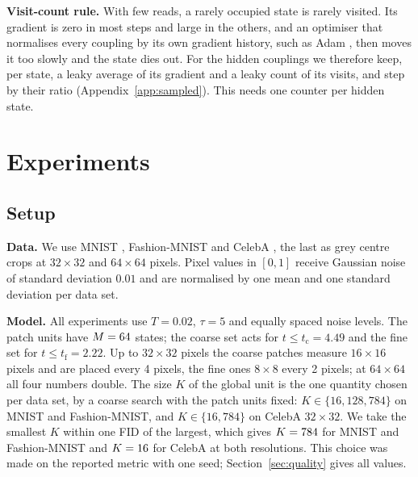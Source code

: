 \documentclass{article}
\newif\ifshownotes
\newcommand{\budget}[1]{\ifshownotes{\noindent\small\itshape\textcolor{notegray}{[Budget: #1]}\par}\fi}
\begin{document}
\textbf{Visit-count rule.}
With few reads, a rarely occupied state is rarely visited. Its gradient is
zero in most steps and large in the others, and an optimiser that normalises
every coupling by its own gradient history, such as Adam
\citep{kingma2015adam}, then moves it too slowly and the state dies out. For
the hidden couplings we therefore keep, per state, a leaky average of its
gradient and a leaky count of its visits, and step by their ratio
(Appendix~\ref{app:sampled}). This needs one counter per hidden state.

\section{Experiments}
\label{sec:experiments}
\budget{3.0 pages planned, including Figures~\ref{fig:ondevice}, \ref{fig:samples} and the tables}

\subsection{Setup}
\label{sec:setup}

\textbf{Data.}
We use MNIST \citep{lecun1998gradient}, Fashion-MNIST \citep{xiao2017fashion}
and CelebA \citep{liu2015deep}, the last as grey centre crops at $32\times32$
and $64\times64$ pixels. Pixel values in $[0,1]$ receive Gaussian noise of
standard deviation $0.01$ and are normalised by one mean and one standard
deviation per data set.

\textbf{Model.}
All experiments use $T=0.02$, $\tau=5$ and \nSlices{} equally spaced noise
levels. The patch units have $M=64$ states; the coarse set acts for
$t\le t_{\mathrm c}=4.49$ and the fine set for $t\le t_{\mathrm f}=2.22$. Up
to $32\times32$ pixels the coarse patches measure $16\times16$ pixels and are
placed every 4 pixels, the fine ones $8\times8$ every 2 pixels; at
$64\times64$ all four numbers double. The size $K$ of the global unit is the
one quantity chosen per data set, by a coarse search with the patch units
fixed: $K\in\{16,128,784\}$ on MNIST and Fashion-MNIST, and $K\in\{16,784\}$
on CelebA $32\times32$. We take the smallest $K$ within one FID of the
largest, which gives $K=784$ for MNIST and Fashion-MNIST and
$K=16$ for CelebA at both resolutions. This choice was made on the
reported metric with one seed; Section~\ref{sec:quality} gives all values.
\end{document}
